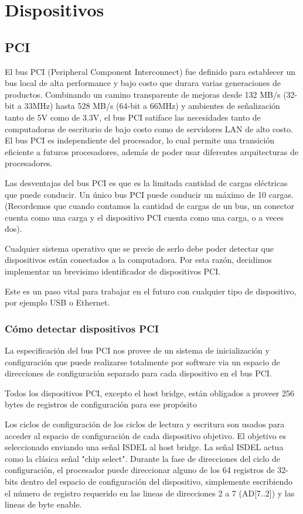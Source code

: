 \chapter{Dispositivos}

\section{PCI}

El bus PCI (Peripheral Component Interconnect) fue definido para establecer un bus local de alta performance y bajo costo que durara varias generaciones de productos.
Combinando un camino transparente de mejoras desde 132 MB/s (32-bit a 33MHz) hasta 528 MB/s (64-bit a 66MHz) y ambientes de señalización tanto de 5V como de 3.3V, el bus PCI satiface las necesidades tanto de computadoras de escritorio de bajo costo como de servidores LAN de alto costo.
El bus PCI es independiente del procesador, lo cual permite una transición eficiente a futuros procesadores, además de poder usar diferentes arquitecturas de procesadores.

Las desventajas del bus PCI es que es la limitada cantidad de cargas eléctricas que puede conducir. Un único bus PCI puede conducir un máximo de 10 cargas. (Recordemos que cuando contamos la cantidad de cargas de un bus, un conector cuenta como una carga y el dispositivo PCI cuenta como una carga, o a veces dos).

Cualquier sistema operativo que se precie de serlo debe poder detectar que dispositivos están conectados a la computadora. Por esta razón, decidimos implementar un brevisimo identificador de dispositivos PCI.

Este es un paso vital para trabajar en el futuro con cualquier tipo de dispositivo, por ejemplo USB o Ethernet.

\subsection{Cómo detectar dispositivos PCI}

La especificación del bus PCI nos provee de un sistema de inicialización y configuración que puede realizarse totalmente por software via un espacio de direcciones de configuración separado para cada dispositivo en el bus PCI.

Todos los dispositivos PCI, excepto el host bridge, están obligados a proveer 256 bytes de registros de configuración para ese propósito

Los ciclos de configuración de los ciclos de lectura y escritura son usados para acceder al espacio de configuración de cada dispositivo objetivo. El objetivo es seleccionado enviando una señal ISDEL al host bridge. La señal ISDEL actua como la clásica señal "chip select". Durante la fase de direcciones del ciclo de configuración, el procesador puede direccionar alguno de los 64 registros de 32-bits dentro del espacio de configuración del dispositivo, simplemente escribiendo el número de registro requerido en las lineas de direcciones 2 a 7 (AD[7..2]) y las lineas de byte enable.

